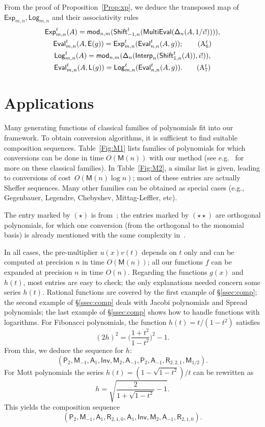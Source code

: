 \documentclass{sig-alternate}
\def\M{\ensuremath{\mathsf{M}}}
\def\mymod {\ensuremath{\mathsf{mod}}}
\def\Lg {\ensuremath{\mathsf{Log}}}
\def\lg {\ensuremath{\mathsf{L}}}
\def\Xp {\ensuremath{\mathsf{Exp}}}
\def\xp {\ensuremath{\mathsf{E}}}
\def\shift {\ensuremath{\mathsf{A}}}
\def\Shift {\ensuremath{\mathsf{Shift}}}
\def\scale {\ensuremath{\mathsf{M}}}
\def\power {\ensuremath{\mathsf{P}}}
\def\root {\ensuremath{\mathsf{R}}}
\def\Diag{\ensuremath{\mathsf{\Delta}}}
\def\inv {\ensuremath{\mathsf{Inv}}}
\def\Eval {\ensuremath{\mathsf{Eval}}}
\begin{document}
  From the proof of
Proposition~\ref{Prop:xp}, we deduce the transposed map of $\Xp_{m,n},
\Lg_{m,n}$ and their associativity rules
\begin{gather}
\Xp^t_{m,n}(A) = \mymod_{n,m} (\Shift_{-1,n}^t({\sf MultiEval}(\Diag_n(A,1/i!)))),\notag\\
\label{AR:6t}\Eval^t_{m,n}(A,\xp(g))= \Xp^t_{m,n}(\Eval^t_{n,n}(A,g));\tag{A$_6^t$}\\
\Lg^t_{m,n}(A) = \mymod_{n,m} (\Diag_n({\sf Interp}_n(\Shift_{1,n}^t(A)),i!)),\notag\\
\label{AR:7t}
\Eval^t_{m,n}(A,\lg(g)) = \Lg^t_{m,n}(\Eval^t_{n,n}(A,g)).\tag{A$_7^t$}
\end{gather}



\section{Applications}\label{sec:applications}

Many generating functions of classical families of polynomials fit
into our framework. To obtain conversion algorithms, it is sufficient
to find suitable composition sequences. Table~\ref{Fig:M1} lists
families of polynomials for which conversions can be done in time
$O(\M(n))$ with our method (see e.g.~\cite{Roman05,AnAsRo99} for more
on these classical families). In Table~\ref{Fig:M2}, a similar list is
given, leading to conversions of cost~$O(\M(n)\log n)$; most of these
entries are actually Sheffer sequences. Many other families can be
obtained as special cases (e.g., Gegenbauer, Legendre, Chebyshev,
Mittag-Leffler, etc). 

The entry marked by $(\star)$ is from~\cite{Gerhard00}; the entries
marked by $(\star\star)$ are orthogonal polynomials, for which one
conversion (from the orthogonal to the monomial basis) is already
mentioned with the same complexity in~\cite{DrHeRo97,PoStTa98}.

In all cases, the pre-multiplier $u(x)v(t)$ depends on $t$ only and
can be computed at precision $n$ in time $O(\M(n))$; all our functions
$f$ can be expanded at precision $n$ in time $O(n)$. Regarding the
functions $g(x)$ and $h(t)$, most entries are easy to check; the only
explanations needed concern some series $h(t)$. Rational functions are
covered by the first example of \S\ref{ssec:comp}; the second example
of \S\ref{ssec:comp} deals with Jacobi polynomials and Spread
polynomials; the last example of \S\ref{ssec:comp} shows how to handle
functions with logarithms.  For Fibonacci polynomials, the function
$h(t)=t/(1-t^2)$ satisfies  $$(2h)^2 = \Big
(\frac{1+t^2}{1-t^2}\Big )^2-1.$$ From this, we deduce the sequence
for $h$:
$$(\power_2, \scale_{-1}, \shift_1, \inv, \scale_2, \shift_{-1},
 \power_2, \shift_{-1}, \root_{2,2,1}, \scale_{1/2}).$$ For
 Mott polynomials the series $h(t)=(1-\sqrt{1-t^2})/t$ can be
 rewritten as
$$h=\sqrt{\frac{2}{1+\sqrt{1-t^2}}-1}.$$ This yields the composition
sequence
$$(\power_2, \scale_{-1}, \shift_1, \root_{2,1,0}, \shift_1, \inv, \scale_2, \shift_{-1}, \root_{2,1,0}).$$
\end{document}
